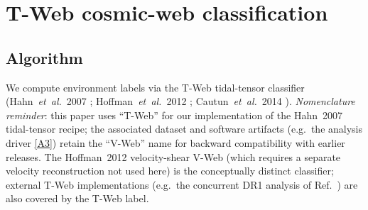 \documentclass[twocolumn,linenumbers]{aastex702}
\newcommand{\repoBase}{https://github.com/Hubify-Projects/bigbounce/blob/main}
\begin{document}
\section{T-Web cosmic-web classification}\label{sec:vweb}

\subsection{Algorithm}\label{sec:vweb_algo}

We compute environment labels via the T-Web tidal-tensor classifier
(Hahn~\textit{et~al.}~2007 \cite{Hahn2007};
Hoffman~\textit{et~al.}~2012 \cite{Hoffman2012};
Cautun~\textit{et~al.}~2014 \cite{Cautun2014}).
\emph{Nomenclature reminder}: this
paper uses ``T-Web'' for our implementation of the Hahn~2007
tidal-tensor recipe; the associated dataset and software artifacts (e.g.\ the
analysis driver
\href{\repoBase/pipelines/p5\_desi\_chirality/env\_finder/01\_compute\_vweb.py}{[A3]})
retain the ``V-Web'' name for backward compatibility with earlier
releases. The Hoffman~2012 velocity-shear V-Web (which requires a separate
velocity reconstruction not used here) is the conceptually distinct
classifier; external T-Web implementations (e.g.\ the concurrent
DR1 analysis of Ref.~\cite{TWebDESI2026}) are also covered by the
T-Web label.
\end{document}
